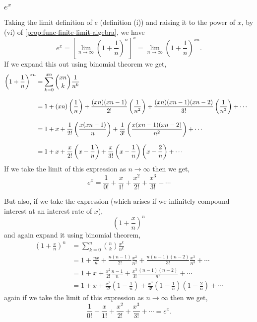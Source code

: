 \documentclass[../MathsNotesBase.tex]{subfiles}
\begin{document}
{	\subsubsection{\texorpdfstring{$e^x$}{e to the power x}}\label{sssection:e-to-the-power-x}
	\bigskip
	Taking the limit definition of $e$ (definition (i)) and raising it to the power of $x$, by (vi) of \autoref{prop:func-finite-limit-algebra}, we have
	\[ e^x = \left[\lim_{n \to \infty} \left(1 + \frac{1}{n}\right)^n\right]^x = \lim_{n \to \infty} \left(1 + \frac{1}{n}\right)^{xn}. \]
	If we expand this out using binomial theorem we get,
	\begin{align*}
	\left(1 + \frac{1}{n}\right)^{xn} &= \sum_{k=0}^{xn} {{xn}\choose{k}} \frac{1}{n^k} \\[8pt]
	    &= 1 + (xn)\left(\frac{1}{n}\right) + \frac{(xn)(xn-1)}{2!}\left(\frac{1}{n^2}\right) + \frac{(xn)(xn-1)(xn-2)}{3!}\left(\frac{1}{n^3}\right) + \cdots &\text{\scriptsize{}} \\[8pt]
	    &= 1 + x + \frac{1}{2!}\left(\frac{x(xn-1)}{n}\right) + \frac{1}{3!}\left(\frac{x(xn-1)(xn-2)}{n^2}\right) + \cdots &\text{\scriptsize{}} \\[8pt]
	    &= 1 + x + \frac{x}{2!}\left(x - \frac{1}{n}\right) + \frac{x}{3!}\left(x - \frac{1}{n}\right)\left(x - \frac{2}{n}\right) + \cdots &\text{\scriptsize{}}
	\end{align*}
	If we take the limit of this expression as ${ n \to \infty }$ then we get,
	\[ e^x = \frac{1}{0!} + \frac{x}{1!} + \frac{x^2}{2!} + \frac{x^3}{3!} + \cdots \]
	
	But also, if we take the expression (which arises if we infinitely compound interest at an interest rate of $x$),
	\[ \left(1 + \frac{x}{n}\right)^n \]
	and again expand it using binomial theorem,
	\begin{align*}
	\left(1 + \frac{x}{n}\right)^n &= \sum_{k=0}^n {{n}\choose{k}} \frac{x^k}{n^k} \\[8pt]
	&= 1 + \frac{nx}{n} + \frac{n(n-1)}{2!}\frac{x^2}{n^2} + \frac{n(n-1)(n-2)}{3!}\frac{x^3}{n^3} + \cdots \\[8pt]
	&= 1 + x + \frac{x^2}{2!}\frac{n-1}{n} + \frac{x^3}{3!}\frac{(n-1)(n-2)}{n^2} + \cdots \\[8pt]
	&= 1 + x + \frac{x^2}{2!}\left(1 - \frac{1}{n}\right) + \frac{x^3}{3!}\left(1 - \frac{1}{n}\right)\left(1 - \frac{2}{n}\right) + \cdots
	\end{align*}
	again if we take the limit of this expression as ${ n \to \infty }$ then we get,
	\[ \frac{1}{0!} + \frac{x}{1!} + \frac{x^2}{2!} + \frac{x^3}{3!} + \cdots = e^x. \]
	
}
\end{document}
